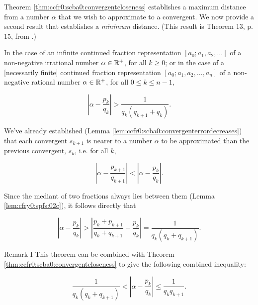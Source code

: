 Theorem \ref{thm:ccfr0:scba0:convergentcloseness} establishes a
maximum distance from a number $\alpha$ that we wish to approximate
to a convergent.  We now provide a second result that establishes
a \emph{minimum} distance.  (This result is Theorem 13, p. 
15, from \cite{bibref:b:KhinchinClassic}.)

\begin{vworktheoremstatement}
\label{thm:ccfr0:scba0:convergentfarness}
In the case of an infinite continued fraction representation 
$[a_0; a_1, a_2, \ldots]$ of
a non-negative irrational number $\alpha \in {\mathbb{R}^+}$, 
for all $k \geq 0$; or in the case of a [necessarily finite]
continued fraction representation $[a_0; a_1, a_2, \ldots , a_n]$ 
of a non-negative rational number
$\alpha \in {\mathbb{R}^+}$, for all $0 \leq k \leq n-1$,

\begin{equation}
\label{eq:thm:ccfr0:scba0:convergentfarness:01}
\left| {\alpha - \frac{p_k}{q_k}} \right| > \frac{1}{q_k(q_{k+1}+q_k)} .
\end{equation}
\end{vworktheoremstatement}
\begin{vworktheoremproof}
We've already established (Lemma \ref{lem:ccfr0:scba0:convergenterrordecreases}) 
that each convergent $s_{k+1}$ is nearer to 
a number $\alpha$ to be approximated than the previous
convergent, $s_k$, i.e. for all $k$,

\begin{equation}
\label{eq:thm:ccfr0:scba0:convergentfarness:02}
\left| {\alpha - \frac{p_{k+1}}{q_{k+1}}} \right| <
\left| {\alpha - \frac{p_{k}}{q_{k}}} \right| .
\end{equation}

Since the mediant of two fractions always lies between
them (Lemma \cfryzeroxrefhyphen{}\ref{lem:cfry0:spfs:02c}), it
follows directly that 

\begin{equation}
\label{eq:thm:ccfr0:scba0:convergentfarness:03}
\left| {\alpha - \frac{p_{k}}{q_{k}}} \right| >
\left| {\frac{p_k + p_{k+1}}{q_k + q_{k+1}} - \frac{p_k}{q_k}} \right| =
\frac{1}{q_k ( q_k + q_{k+1})} .
\end{equation}
\end{vworktheoremproof}
\begin{vworktheoremparsection}{Remark I}
This theorem can be combined with Theorem \ref{thm:ccfr0:scba0:convergentcloseness}
to give the following combined inequality:

\begin{equation}
\label{eq:thm:ccfr0:scba0:convergentfarness:04}
\frac{1}{q_k ( q_k + q_{k+1})} < 
\left| {\alpha - \frac{p_{k}}{q_{k}}} \right| \leq
\frac{1}{q_k q_{k+1}} .
\end{equation}
\end{vworktheoremparsection}
\vworktheoremfooter{}

